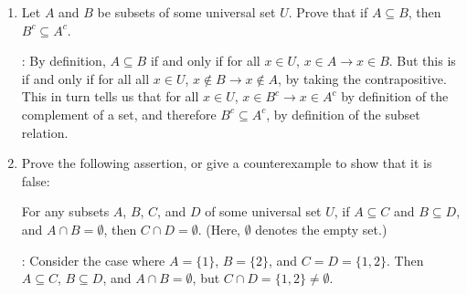 \documentclass[12pt]{article}
\newcommand{\points}[1]{\marginpar{\hspace{24pt}[#1]}}
\begin{document}
\thispagestyle{fancy}

\bigskip

 \begin{enumerate}
 \item  Let $A$ and $B$ be subsets of some universal set $U$. \points{5} Prove that if $A\subseteq B$, then $B^c\subseteq A^c$.

\bigskip

: By definition, $A\subseteq B$ if and only if for all $x\in U$, $x\in A \to x\in B$. But this is if and only if for all all $x\in U$, $x\notin B\to x\notin A$, by taking the contrapositive. This in turn tells us that for all $x\in U$, $x\in B^c\to x\in A^c$ by definition of the complement of a set, and therefore $B^c\subseteq A^c$, by definition of the subset relation.

\newpage

\item  Prove the following assertion, or give a counterexample to show that it is false:\points{5}

For any subsets $A$, $B$, $C$, and $D$ of some universal set $U$, if $A\subseteq C$ and $B\subseteq D$, and $A\cap B=\emptyset$, then $C\cap D=\emptyset$.
(Here, $\emptyset$ denotes the empty set.)

\bigskip

: Consider the case where $A=\{1\}$, $B=\{2\}$, and $C=D=\{1,2\}$. Then $A\subseteq C$, $B\subseteq D$, and $A\cap B = \emptyset$, but $C\cap D = \{1,2\}\neq \emptyset$.
\end{enumerate}
\end{document}
